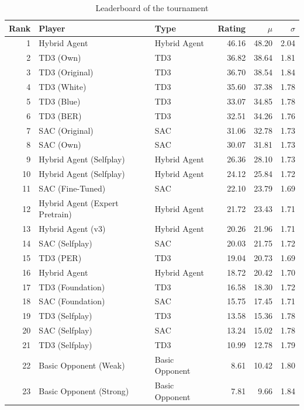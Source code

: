 \begin{table}[H]
\caption{Leaderboard of the tournament} \centering {}
\label{tab:tournament_leaderboard}
\begin{tabular}{rllrrr}
\toprule
Rank & Player & Type & Rating & $\mu$ & $\sigma$ \\
\midrule
1 & Hybrid Agent & Hybrid Agent & 46.16 & 48.20 & 2.04 \\
2 & TD3 (Own) & TD3 & 36.82 & 38.64 & 1.81 \\
3 & TD3 (Original) & TD3 & 36.70 & 38.54 & 1.84 \\
4 & TD3 (White) & TD3 & 35.60 & 37.38 & 1.78 \\
5 & TD3 (Blue) & TD3 & 33.07 & 34.85 & 1.78 \\
6 & TD3 (BER) & TD3 & 32.51 & 34.26 & 1.76 \\
7 & SAC (Original) & SAC & 31.06 & 32.78 & 1.73 \\
8 & SAC (Own) & SAC & 30.07 & 31.81 & 1.73 \\
9 & Hybrid Agent (Selfplay) & Hybrid Agent & 26.36 & 28.10 & 1.73 \\
10 & Hybrid Agent (Selfplay) & Hybrid Agent & 24.12 & 25.84 & 1.72 \\
11 & SAC (Fine-Tuned) & SAC & 22.10 & 23.79 & 1.69 \\
12 & Hybrid Agent (Expert Pretrain) & Hybrid Agent & 21.72 & 23.43 & 1.71 \\
13 & Hybrid Agent (v3) & Hybrid Agent & 20.26 & 21.96 & 1.71 \\
14 & SAC (Selfplay) & SAC & 20.03 & 21.75 & 1.72 \\
15 & TD3 (PER) & TD3 & 19.04 & 20.73 & 1.69 \\
16 & Hybrid Agent & Hybrid Agent & 18.72 & 20.42 & 1.70 \\
17 & TD3 (Foundation) & TD3 & 16.58 & 18.30 & 1.72 \\
18 & SAC (Foundation) & SAC & 15.75 & 17.45 & 1.71 \\
19 & TD3 (Selfplay) & TD3 & 13.58 & 15.36 & 1.78 \\
20 & SAC (Selfplay) & SAC & 13.24 & 15.02 & 1.78 \\
21 & TD3 (Selfplay) & TD3 & 10.99 & 12.78 & 1.79 \\
22 & Basic Opponent (Weak) & Basic Opponent & 8.61 & 10.42 & 1.80 \\
23 & Basic Opponent (Strong) & Basic Opponent & 7.81 & 9.66 & 1.84 \\
\bottomrule
\end{tabular}
\end{table}
